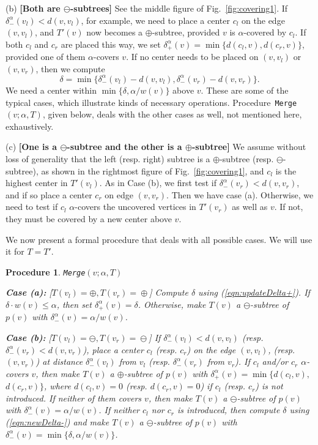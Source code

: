 \documentclass{llncs}
\newtheorem{procedure}{Procedure}
\begin{document}
{(b) {\bf [Both are $\ominus$-subtrees]} See the middle figure of  Fig.~\ref{fig:covering1}.
If $\delta_-^{\alpha}(v_l) <d(v,v_l)$,
for example,
we need to place a center $c_l$ on the edge $(v,v_l)$, 
and $T'(v)$ now becomes a $\oplus$-subtree,
provided $v$ is $\alpha$-covered by $c_l$.
If both $c_l$ and $c_r$ are placed this way,
we set $\delta_+^{\alpha}(v)= \min\{d(c_l,v), d(c_r,v)\}$,
provided one of them $\alpha$-covers $v$.
If no center needs to be placed on $(v,v_l)$ or $(v,v_r)$,
then we compute
\begin{equation}\label{eqn:newDelta-}
\delta=\min\{\delta_-^{\alpha}(v_l) -d(v,v_l), \delta_-^{\alpha}(v_r)-d(v,v_r)\}.
\end{equation}
We need a center within $\min\{\delta,\alpha/w(v)\}$ above $v$.
These are some of the typical cases,
which illustrate kinds of necessary operations.
Procedure~{\tt Merge}$(v; \alpha, T)$, given below,
deals with the other cases as well, not mentioned here,
exhaustively.

(c) {\bf [One is a $\ominus$-subtree and the other is a $\oplus$-subtree]}
We assume without loss of generality that the left (resp. right) subtree is
a $\oplus$-subtree (resp. $\ominus$-subtree), as shown in the rightmost figure of  Fig.~\ref{fig:covering1},
and $c_l$ is the highest center in $T'(v_l)$.
As in Case (b),
we first test if $\delta_-^{\alpha}(v_r) < d(v,v_r)$,
and if so place a center $c_r$ on edge $(v,v_r)$.
Then we have case (a).
Otherwise,
we need to test if $c_l$ $\alpha$-covers the uncovered vertices in $T'(v_r)$
as well as $v$.
If not, they must be covered by a new center above $v$.

We now present a formal procedure that deals with all possible cases.
We will use it for $T= T'$.
\begin{procedure} {\tt Merge}$(v; \alpha, T)$\label{proc:merge}

\smallskip\noindent
{\bf Case (a):}
{\rm [$T(v_l)\!=\!\oplus, T(v_r)\!=\!\oplus$]}
Compute $\delta$ using (\ref{eqn:updateDelta+}).
If $\delta\cdot w(v) \leq \alpha$,
then set $\delta_+^{\alpha}(v)=\delta$. 
Otherwise, make $T(v)$ a $\ominus$-subtree of $p(v)$ with $\delta_-^{\alpha}(v)=\alpha/w(v)$.

\smallskip\noindent
{\bf Case (b):}
{\rm [$T(v_l)\!=\!\ominus, T(v_r)\!=\!\ominus$]}
If $\delta_-^{\alpha}(v_l) <d(v,v_l)$
(resp. $\delta_-^{\alpha}(v_r) < d(v,v_r)$),
place a center $c_l$ (resp. $c_r$)
on the edge $(v,v_l)$, (resp. $(v,v_r)$) at distance $\delta_-^{\alpha}(v_l)$ from $v_l$
(resp.  $\delta_-^{\alpha}(v_r) $ from $v_r$).
If $c_l$ and/or $c_r$ $\alpha$-covers $v$,
then make $T(v)$ a $\oplus$-subtree of $p(v)$ with
$\delta_+^{\alpha}(v)= \min\{d(c_l,v),$ $d(c_r,v)\}$,
where $d(c_l,v)=0$ (resp. $d(c_r,v)=0$) if
$c_l$ (resp. $c_r$) is not introduced.
If neither of them covers $v$,
then make $T(v)$ a $\ominus$-subtree of $p(v)$ with $\delta_-^{\alpha}(v)=\alpha/w(v)$.
If neither $c_l$ nor $c_r$ is introduced,
then compute $\delta$ using (\ref{eqn:newDelta-})
and make $T(v)$ a $\ominus$-subtree of $p(v)$ with $\delta_-^{\alpha}(v)=\min\{\delta,\alpha/w(v)\}$.



\end{procedure}}
\end{document}

